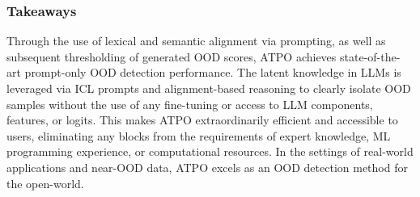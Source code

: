 \subsubsection{Takeaways} 

Through the use of lexical and semantic alignment via prompting, as well as subsequent thresholding of generated OOD scores, ATPO achieves state-of-the-art prompt-only OOD detection performance. The latent knowledge in LLMs is leveraged via ICL prompts and alignment-based reasoning to clearly isolate OOD samples without the use of any fine-tuning or access to LLM components, features, or logits. This makes ATPO extraordinarily efficient and accessible to users, eliminating any blocks from the requirements of expert knowledge, ML programming experience, or computational resources. In the settings of real-world applications and near-OOD data, ATPO excels as an OOD detection method for the open-world.